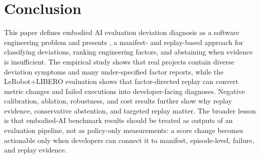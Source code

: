 \section{Conclusion}
\label{sec:conclusion}

This paper defines embodied AI evaluation deviation diagnosis as a software engineering problem and presents \sys, a manifest- and replay-based approach for classifying deviations, ranking engineering factors, and abstaining when evidence is insufficient. The empirical study shows that real projects contain diverse deviation symptoms and many under-specified factor reports, while the LeRobot+LIBERO evaluation shows that factor-directed replay can convert metric changes and failed executions into developer-facing diagnoses. Negative calibration, ablation, robustness, and cost results further show why replay evidence, conservative abstention, and targeted replay matter. The broader lesson is that embodied-AI benchmark results should be treated as outputs of an evaluation pipeline, not as policy-only measurements: a score change becomes actionable only when developers can connect it to manifest, episode-level, failure, and replay evidence.
